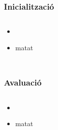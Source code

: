 \documentclass{beamer}
\begin{document}
\begin{frame}
	\frametitle{Inicialització}
	\begin{columns}[c]
		\begin{itemize}
			\item 
				\pause
			\item matat
		\end{itemize}
	\end{columns}
\end{frame}

\begin{frame}
	\frametitle{Avaluació}
	\begin{columns}[c]
		\begin{itemize}
			\item 
				\pause
			\item matat
		\end{itemize}
	\end{columns}
\end{frame}
\end{document}
